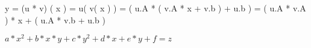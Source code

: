 \documentclass{article}
\begin{document}
y = (u * v) ( x ) = u( v( x ) ) = ( u.A * ( v.A * x + v.b ) + u.b ) = ( u.A * v.A ) * x + ( u.A * v.b + u.b )
\pagebreak

$ a*x^2 + b*x*y + c*y^2 + d*x + e*y + f = z $
\pagebreak
\end{document}
